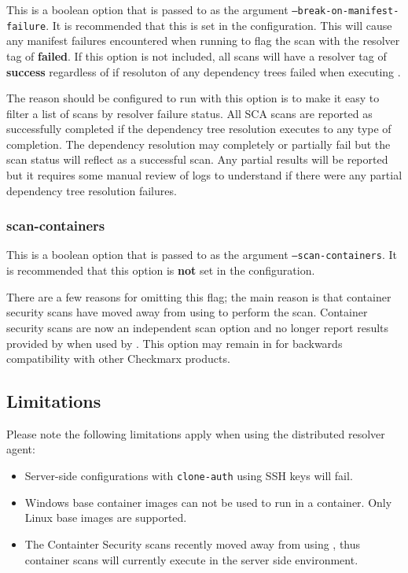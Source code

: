 This is a boolean option that is passed to \scaresolver as the argument \texttt{--break-on-manifest-failure}.  It is recommended
that this is set in the  configuration.  This will cause any manifest failures
encountered when running \scaresolver to flag the scan with the resolver tag of \textbf{failed}.  If this option is not included,
all scans will have a resolver tag of \textbf{success} regardless of if resoluton of any dependency trees failed when
executing \scaresolverns.

The reason \scaresolver should be configured to run with this option is to make it easy to filter a list of scans by resolver
failure status.  All SCA scans are reported as successfully completed if the dependency tree resolution executes to
any type of completion.  The dependency resolution may completely or partially fail but the scan status will reflect
as a successful scan.  Any partial results will be reported but it requires some manual review of logs to understand if there
were any partial dependency tree resolution failures.

\subsubsection{scan-containers}
This is a boolean option that is passed to \scaresolver as the argument \texttt{--scan-containers}.  It is recommended that
this option is \textbf{not} set in the  configuration.

There are a few reasons for omitting this flag; the main reason is that container security scans have moved away from
using \scaresolver to perform the scan.  Container security scans are now an independent scan option and no longer
report results provided by \scaresolver when used by \cxonens.  This option may remain in \scaresolver for backwards
compatibility with other Checkmarx products.

\subsection{Limitations}
Please note the following limitations apply when using the distributed resolver agent:

\begin{itemize}
  \item Server-side configurations with \texttt{clone-auth} using SSH keys will fail.
  \item Windows base container images can not be used to run \scaresolver in a container.  Only Linux base images are supported.
  \item The Containter Security scans recently moved away from using \scaresolverns, thus container scans will currently
    execute in the \cxoneflow server side environment.
\end{itemize}

